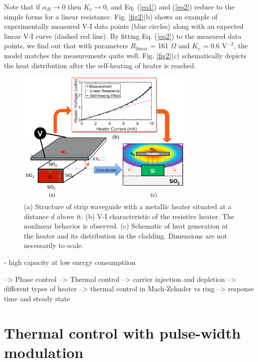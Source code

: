 %
Note that if $\alpha_H \rightarrow 0$ then $K_v \rightarrow 0$, and Eq. (\ref{eq1}) and (\ref{eq2}) reduce to the simple forms for a linear resistance. 
Fig. \ref{fig2}(b) shows an example of experimentally measured V-I data points (blue circles) along with an expected linear V-I curve (dashed red line). By fitting Eq. (\ref{eq2}) to the measured data points, we find out that with parameters $R_\text{linear}$ = 161 $\Omega$ and $K_v$ = 0.6 V$^{-2}$, the model matches the measurements quite well. Fig. \ref{fig2}(c) schematically depicts the heat distribution after the self-heating of heater is reached.







\begin{figure}[t]
\begin{center}
\includegraphics[width=8.5cm]{Chapter2/CH3_fig2.pdf}
\caption{(a) Structure of strip waveguide with a metallic heater situated at a distance $d$ above it. (b) V-I characteristic of the resistive heater. The nonlinear behavior is observed. (c) Schematic of heat generation at the heater and its distribution in the cladding. Dimensions are not necessarily to scale.}
\label{CH3_fig2}
\end{center}
\vspace{-0.65cm}
\end{figure}





- high capacity at low energy consumptiion

--> Phase control
--> Thermal control --> carrier injection and depletion 
--> different types of heater
--> thermal control in Mach-Zehnder vs ring 
--> response time and steady state

\section{Thermal control with pulse-width modulation}

